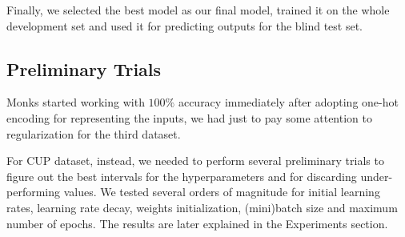 Finally, we selected the best model as our final model, trained it on the whole development set and used it for predicting outputs for the blind test set.

\subsection{Preliminary Trials}
\label{subsection:preliminary_trials}
Monks started working with $100\%$ accuracy immediately after adopting one-hot encoding for representing the inputs, we had just to pay some attention to regularization for the third dataset.

For CUP dataset, instead, we needed to perform several preliminary trials to figure out the best intervals for the hyperparameters and for discarding under-performing values. We tested several orders of magnitude for initial learning rates, learning rate decay, weights initialization, (mini)batch size and maximum number of epochs. The results are later explained in the Experiments section.


